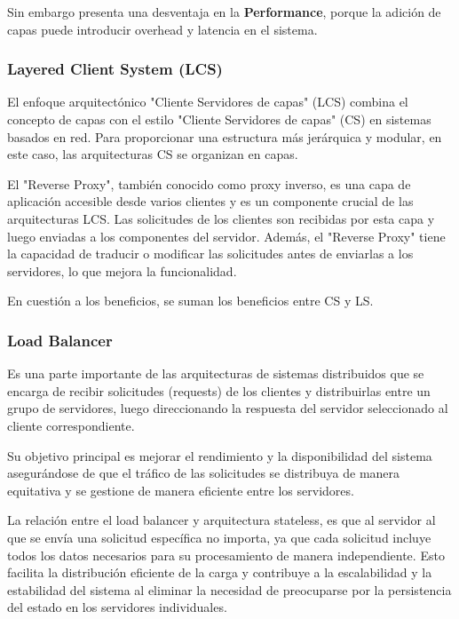 \documentclass{article}
\begin{document}
		Sin embargo presenta una desventaja en la \textbf{Performance}, porque la adición de capas puede introducir overhead y latencia en el sistema.
	
		
		
		
		\subsubsection{Layered Client System (LCS)}
		El enfoque arquitectónico "Cliente Servidores de capas" (LCS) combina el concepto de capas con el estilo "Cliente Servidores de capas" (CS) en sistemas basados en red. Para proporcionar una estructura más jerárquica y modular, en este caso, las arquitecturas CS se organizan en capas.
		
		El "Reverse Proxy", también conocido como proxy inverso, es una capa de aplicación accesible desde varios clientes y es un componente crucial de las arquitecturas LCS. Las solicitudes de los clientes son recibidas por esta capa y luego enviadas a los componentes del servidor. Además, el "Reverse Proxy" tiene la capacidad de traducir o modificar las solicitudes antes de enviarlas a los servidores, lo que mejora la funcionalidad.
		
		En cuestión a los beneficios, se suman los beneficios entre CS y LS.
		
		\subsubsection{Load Balancer}
		Es una parte importante de las arquitecturas de sistemas distribuidos que se encarga de recibir solicitudes (requests) de los clientes y distribuirlas entre un grupo de servidores, luego direccionando la respuesta del servidor seleccionado al cliente correspondiente. 
		
		Su objetivo principal es mejorar el rendimiento y la disponibilidad del sistema asegurándose de que el tráfico de las solicitudes se distribuya de manera equitativa y se gestione de manera eficiente entre los servidores.
		
		La relación entre el load balancer y arquitectura stateless, es que al servidor al que se envía una solicitud específica no importa, ya que cada solicitud incluye todos los datos necesarios para su procesamiento de manera independiente. Esto facilita la distribución eficiente de la carga y contribuye a la escalabilidad y la estabilidad del sistema al eliminar la necesidad de preocuparse por la persistencia del estado en los servidores individuales.
		
\end{document}
